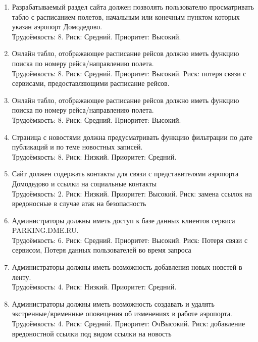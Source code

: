 
\begin{enumerate}
    \item Разрабатываемый раздел сайта должен позволять пользователю
          просматривать табло с расписанием полетов, начальным или
          конечным пунктом которых указан аэропорт Домодедово. \\
          Трудоёмкость: 8. Риск: Средний. Приоритет: Высокий.

    \item Онлайн табло, отображающее расписание рейсов должно иметь
          функцию поиска по номеру рейса/направлению полета. \\
          Трудоёмкость: 8. Риск: Средний. Приоритет: Высокий.
          Риск: потеря связи с сервисами, предоставляющими расписание рейсов.

    \item Онлайн табло, отображающее расписание рейсов должно иметь
          функцию поиска по номеру рейса/направлению полета. \\
          Трудоёмкость: 8. Риск: Средний. Приоритет: Высокий.

    \item Страница с новостями должна предусматривать функцию
          фильтрации по дате публикаций и по теме новостных записей. \\
          Трудоёмкость: 8. Риск: Низкий. Приоритет: Средний.
          
    \item Сайт должен содержать контакты для связи с представителями
          аэропорта Домодедово и ссылки на социальные контакты \\
          Трудоёмкость: 2. Риск: Низкий. Приоритет: Высокий.
          Риск: замена ссылок на вредоносные в случае атак на безопасность

    \item Администраторы должны иметь доступ к базе данных клиентов
          сервиса PARKING.DME.RU. \\
          Трудоёмкость: 6. Риск: Средний. Приоритет: Высокий.
          Риск: Потеря связи с сервисом, Потеря данных пользователей во 
          время запроса

    \item Администраторы должны иметь возможность добавления новых
          новстей в ленту. \\
          Трудоёмкость: 4. Риск: Низкий. Приоритет: Средний.

    \item Администраторы должны иметь возможность создавать и удалять
          экстренные/временные оповещения об изменениях в работе аэропорта. \\
          Трудоёмкость: 4. Риск: Средний. Приоритет: ОчВысокий.
          Риск: добавление вредоностной ссылки под видом ссылки на новость


\end{enumerate}
